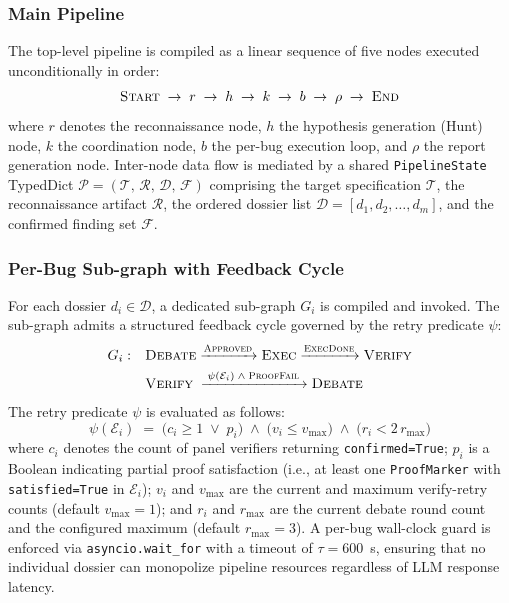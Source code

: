 \subsubsection{Main Pipeline}

The top-level pipeline is compiled as a linear sequence of five nodes
executed unconditionally in order:
\begin{equation}
  \textsc{Start}
  \;\to\; r
  \;\to\; h
  \;\to\; k
  \;\to\; b
  \;\to\; \rho
  \;\to\; \textsc{End}
  \label{eq:main_pipeline}
\end{equation}
where $r$ denotes the reconnaissance node, $h$ the hypothesis generation
(Hunt) node, $k$ the coordination node, $b$ the per-bug execution loop,
and $\rho$ the report generation node.
Inter-node data flow is mediated by a shared
\texttt{PipelineState} TypedDict
$\mathcal{P} = (\mathcal{T},\, \mathcal{R},\, \mathcal{D},\, \mathcal{F})$
comprising the target specification $\mathcal{T}$, the reconnaissance
artifact $\mathcal{R}$, the ordered dossier list
$\mathcal{D} = [d_1, d_2, \ldots, d_m]$, and the confirmed finding set
$\mathcal{F}$.

\subsubsection{Per-Bug Sub-graph with Feedback Cycle}

For each dossier $d_i \in \mathcal{D}$, a dedicated sub-graph $G_i$ is
compiled and invoked.
The sub-graph admits a structured feedback cycle governed by the retry
predicate $\psi$:
\begin{align}
  G_i:\quad
  & \textsc{Debate}
    \xrightarrow{\textsc{Approved}}
    \textsc{Exec}
    \xrightarrow{\textsc{ExecDone}}
    \textsc{Verify}
  \notag \\
  & \textsc{Verify}
    \;\xrightarrow{\;\psi(\mathcal{E}_i)\;\wedge\;\textsc{ProofFail}\;}
    \textsc{Debate}
  \label{eq:bug_subgraph}
\end{align}
The retry predicate $\psi$ is evaluated as follows:
\begin{equation}
  \psi(\mathcal{E}_i)
  \;=\;
  \bigl(c_i \geq 1 \;\vee\; p_i\bigr)
  \;\wedge\;
  \bigl(v_i \leq v_{\max}\bigr)
  \;\wedge\;
  \bigl(r_i < 2\,r_{\max}\bigr)
  \label{eq:retry_predicate}
\end{equation}
where $c_i$ denotes the count of panel verifiers returning
\texttt{confirmed=True}; $p_i$ is a Boolean indicating partial proof
satisfaction (i.e., at least one \texttt{ProofMarker} with
\texttt{satisfied=True} in $\mathcal{E}_i$); $v_i$ and $v_{\max}$ are
the current and maximum verify-retry counts (default $v_{\max}=1$);
and $r_i$ and $r_{\max}$ are the current debate round count and the
configured maximum (default $r_{\max}=3$).
A per-bug wall-clock guard is enforced via
\texttt{asyncio.wait\_for} with a timeout of $\tau = 600$~s,
ensuring that no individual dossier can monopolize pipeline resources
regardless of LLM response latency.

